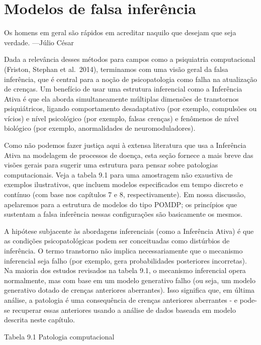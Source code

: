 \documentclass[
  12pt,
]{book}
\begin{document}
\hypertarget{modelos-de-falsa-inferuxeancia}{%
\section{Modelos de falsa inferência}\label{modelos-de-falsa-inferuxeancia}}

Os homens em geral são rápidos em acreditar naquilo que desejam que seja verdade. ---Júlio César

Dada a relevância desses métodos para campos como a psiquiatria computacional (Friston, Stephan et al.~2014), terminamos com uma visão geral da falsa inferência, que é central para a noção de psicopatologia como falha na atualização de crenças. Um benefício de usar uma estrutura inferencial como a Inferência Ativa é que ela aborda simultaneamente múltiplas dimensões de transtornos psiquiátricos, ligando comportamento desadaptativo (por exemplo, compulsões ou vícios) e nível psicológico (por exemplo, falsas crenças) e fenômenos de nível biológico (por exemplo, anormalidades de neuromoduladores).

Como não podemos fazer justiça aqui à extensa literatura que usa a Inferência Ativa na modelagem de processos de doença, esta seção fornece a mais breve das visões gerais para sugerir uma estrutura para pensar sobre patologias computacionais. Veja a tabela 9.1 para uma amostragem não exaustiva de exemplos ilustrativos, que incluem modelos especificados em tempo discreto e contínuo (com base nos capítulos 7 e 8, respectivamente). Em nossa discussão, apelaremos para a estrutura de modelos do tipo POMDP; os princípios que sustentam a falsa inferência nessas configurações são basicamente os mesmos.

A hipótese subjacente às abordagens inferenciais (como a Inferência Ativa) é que as condições psicopatológicas podem ser conceituadas como distúrbios de inferência. O termo transtorno não implica necessariamente que o mecanismo inferencial seja falho (por exemplo, gera probabilidades posteriores incorretas). Na maioria dos estudos revisados na tabela 9.1, o mecanismo inferencial opera normalmente, mas com base em um modelo generativo falho (ou seja, um modelo generativo dotado de crenças anteriores aberrantes). Isso significa que, em última análise, a patologia é uma consequência de crenças anteriores aberrantes - e pode-se recuperar essas anteriores usando a análise de dados baseada em modelo descrita neste capítulo.

Tabela 9.1 Patologia computacional
\end{document}

